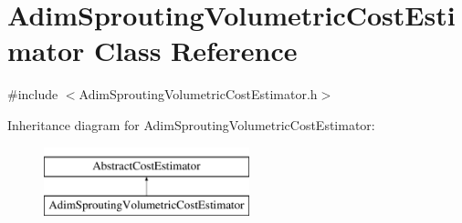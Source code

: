 \hypertarget{class_adim_sprouting_volumetric_cost_estimator}{}\section{Adim\+Sprouting\+Volumetric\+Cost\+Estimator Class Reference}
\label{class_adim_sprouting_volumetric_cost_estimator}


{\ttfamily \#include $<$Adim\+Sprouting\+Volumetric\+Cost\+Estimator.\+h$>$}

Inheritance diagram for Adim\+Sprouting\+Volumetric\+Cost\+Estimator\+:\begin{figure}[H]
\begin{center}
\leavevmode
\includegraphics[height=2.000000cm]{dd/da2/class_adim_sprouting_volumetric_cost_estimator}
\end{center}
\end{figure}
